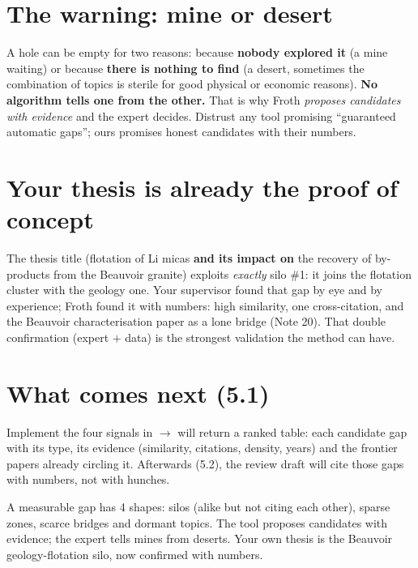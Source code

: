 \documentclass[11pt,a4paper]{article}
\begin{document}
\section{The warning: mine or desert}

\begin{ojo}
A hole can be empty for two reasons: because \textbf{nobody explored it} (a mine waiting) or
because \textbf{there is nothing to find} (a desert, sometimes the combination of topics is
sterile for good physical or economic reasons). \textbf{No algorithm tells one from the
other.} That is why Froth \emph{proposes candidates with evidence} and the expert decides.
Distrust any tool promising ``guaranteed automatic gaps''; ours promises honest candidates
with their numbers.
\end{ojo}

\section{Your thesis is already the proof of concept}

The thesis title (flotation of Li micas \textbf{and its impact on} the recovery of by-products
from the Beauvoir granite) exploits \emph{exactly} silo \#1: it joins the flotation cluster
with the geology one. Your supervisor found that gap by eye and by experience; Froth found it
with numbers: high similarity, one cross-citation, and the Beauvoir characterisation paper as
a lone bridge (Note 20). That double confirmation (expert $+$ data) is the strongest validation
the method can have.

\section{What comes next (5.1)}

Implement the four signals in  $\rightarrow$  will return
a ranked table: each candidate gap with its type, its evidence (similarity, citations,
density, years) and the frontier papers already circling it. Afterwards (5.2), the review
draft will cite those gaps with numbers, not with hunches.

\begin{resumen}
A measurable gap has 4 shapes: silos (alike but not citing each other), sparse zones, scarce
bridges and dormant topics. The tool proposes candidates with evidence; the expert tells mines
from deserts. Your own thesis is the Beauvoir geology-flotation silo, now confirmed with
numbers.
\end{resumen}
\end{document}
